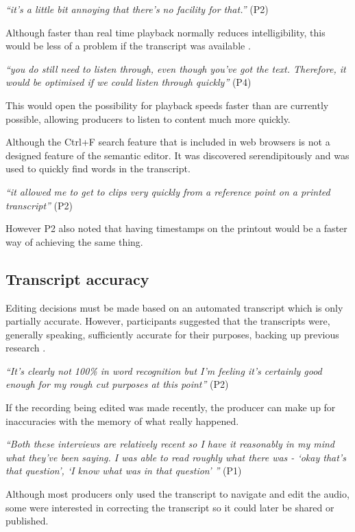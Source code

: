 \textit{``it's a little bit annoying that there's no facility for that.''}
(P2)

Although faster than real time playback normally reduces
intelligibility, this would be less of a problem if the transcript was
available \cite{Ranjan2006}.

\textit{``you do still need to listen through, even though you've got the text.
Therefore, it would be optimised if we could listen through quickly''}
(P4)

This would open the possibility for playback speeds faster than are currently
possible, allowing producers to listen to content much more quickly.


Although the Ctrl+F search feature that is included in web browsers is not a
designed feature of the semantic editor. It was discovered serendipitously and
was used to quickly find words in the transcript.

\textit{``it allowed me to get to clips very quickly from a reference point on
  a printed transcript''} (P2)

However P2 also noted that having timestamps on the printout would be a faster
way of achieving the same thing.

\subsection{Transcript accuracy}
Editing decisions must be made based on an automated transcript which is only
partially accurate. However, participants suggested that the transcripts were,
generally speaking, sufficiently accurate for their purposes, backing up 
previous research \cite{Whittaker2004}.

\textit{``It's clearly not 100\% in word recognition but I'm feeling it's
  certainly good enough for my rough cut purposes at this point''} (P2)

If the recording being edited was made recently, the producer can make up for
inaccuracies with the memory of what really happened.

\textit{``Both these interviews are relatively recent so I have it reasonably
  in my mind what they've been saying. I was able to read roughly what there
  was - `okay that's that question', `I know what was in that question' ''} (P1)

Although most producers only used the transcript to navigate and edit the
audio, some were interested in correcting the transcript so it could later be
shared or published.

